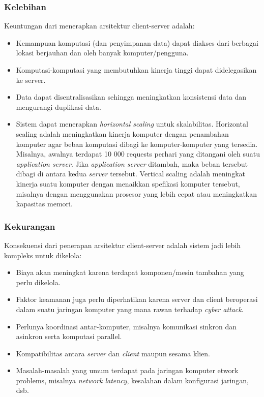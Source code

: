 \subsubsection{Kelebihan}
Keuntungan dari menerapkan arsitektur client-server adalah:
\begin{itemize}
\item Kemampuan komputasi (dan penyimpanan data) dapat diakses dari berbagai lokasi berjauhan dan oleh banyak komputer/pengguna.
\item Komputasi-komputasi yang membutuhkan kinerja tinggi dapat didelegasikan ke server.
\item Data dapat disentralisasikan sehingga meningkatkan konsistensi data dan mengurangi duplikasi data.
\item  Sistem dapat menerapkan \textit{horizontal scaling }untuk skalabilitas. Horizontal scaling adalah meningkatkan kinerja komputer dengan penambahan komputer agar beban komputasi dibagi ke komputer-komputer yang tersedia. Misalnya, awalnya terdapat 10 000 requests perhari yang ditangani oleh suatu \textit{application server}. Jika \textit{application server} ditambah, maka beban tersebut dibagi di antara kedua \textit{server} tersebut. Vertical scaling adalah meningkat kinerja suatu komputer dengan menaikkan spefikasi komputer tersebut, misalnya dengan menggunakan prosesor yang lebih cepat atau meningkatkan kapasitas memori.
\end{itemize}

\subsubsection{Kekurangan}
Konsekuensi dari penerapan arsitektur client-server adalah sistem jadi lebih kompleks untuk dikelola:
\begin{itemize}
\item Biaya akan meningkat karena terdapat komponen/mesin tambahan yang perlu dikelola.
\item Faktor keamanan juga perlu diperhatikan karena server dan client beroperasi dalam suatu jaringan komputer yang mana rawan terhadap \textit{cyber attack}.
\item Perlunya koordinasi antar-komputer, misalnya komunikasi sinkron dan asinkron serta komputasi parallel.
\item Kompatibilitas antara \textit{server} dan \textit{client} maupun sesama klien.
\item Masalah-masalah yang umum terdapat pada jaringan komputer etwork problems, misalnya \textit{network latency}, kesalahan dalam konfigurasi jaringan, dsb.
\end{itemize}

